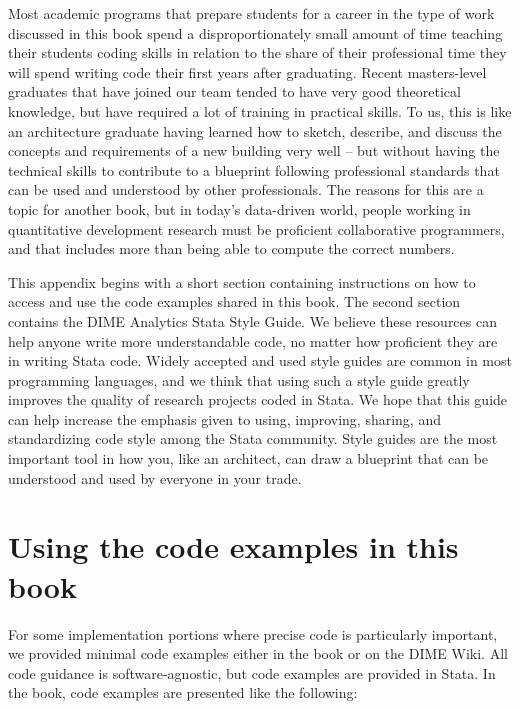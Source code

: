 
\begin{fullwidth}

Most academic programs that prepare students for a career
in the type of work discussed in this book
spend a disproportionately small amount of time teaching their students coding skills
in relation to the share of their professional time they will spend writing code
their first years after graduating.
Recent masters-level graduates that have joined our team
tended to have very good theoretical knowledge,
but have required a lot of training in practical skills.
To us, this is like an architecture graduate having learned
how to sketch, describe, and discuss
the concepts and requirements of a new building very well --
but without having the technical skills
to contribute to a blueprint following professional standards
that can be used and understood by other professionals.
The reasons for this are a topic for another book,
but in today's data-driven world,
people working in quantitative development research must be proficient collaborative programmers,
and that includes more than being able to compute the correct numbers.

This appendix begins with a short section containing instructions
on how to access and use the code examples shared in this book.
The second section contains the DIME Analytics Stata Style Guide.
We believe these resources can help anyone write more understandable code,
no matter how proficient they are in writing Stata code.
Widely accepted and used style guides are common in most programming languages,
and we think that using such a style guide greatly improves the quality
of research projects coded in Stata.
We hope that this guide can help increase the emphasis
given to using, improving, sharing, and standardizing code style among the Stata community.
Style guides are the most important tool in how you, like an architect,
can draw a blueprint that can be understood and used by everyone in your trade.

\end{fullwidth}


\section{Using the code examples in this book}

For some implementation portions where precise code is particularly important,
we provided minimal code examples either in the book or on the DIME Wiki.
All code guidance is software-agnostic, but code examples are provided in Stata.
In the book, code examples are presented like the following:

